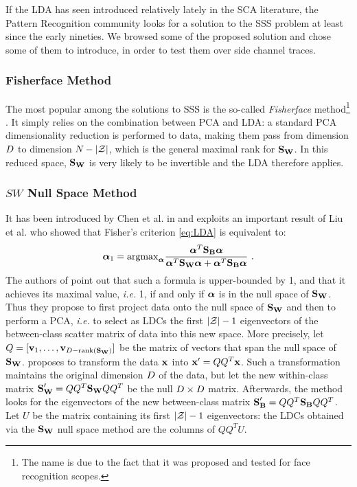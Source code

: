 If the LDA has seen introduced relatively lately in the SCA literature, the Pattern Recognition community looks for a solution to the SSS problem at least since the early nineties. We browsed some of the proposed solution and chose some of them to introduce, in order to test them over side channel traces.

\subsubsection{Fisherface Method}
The most popular among the solutions to SSS is the so-called {\em Fisherface} method\footnote{The name is due to the fact that it was proposed and tested for face recognition scopes.} \cite{eigenfaces}. It simply relies on the combination between PCA and LDA: a standard PCA dimensionality reduction is performed to data, making them pass from dimension $\traceLength$ to dimension $\numTraces[]-\lvert \sensVarSet \rvert$, which is the general maximal rank for $\SW$. In this reduced space, $\SW$ is very likely to be invertible and the LDA therefore applies.

\subsubsection{$SW$ Null Space Method}
It has been introduced by Chen et al. in \cite{Chen2000} and exploits an important result of Liu et al. \cite{liu1992generalized} who showed that Fisher's criterion \eqref{eq:LDA} is equivalent to:
 \begin{equation}
 \AAlpha_1=\mathrm{argmax}_{\AAlpha} \frac{\AAlpha^T \SB \AAlpha}{\AAlpha^T \SW \AAlpha + \AAlpha^T \SB \AAlpha} \mbox{ .}
 \end{equation}
The authors of \cite{Chen2000} point out that such a formula is upper-bounded by 1, and that it achieves its maximal value, \textit{i.e.} 1, if and only if  $\AAlpha$ is in the null space of $\SW$. Thus they propose to first project data onto the null space of $\SW$ and then to perform a PCA, \textit{i.e.} to select as LDCs the first $\lvert \sensVarSet \rvert - 1$ eigenvectors of the between-class scatter matrix of data into this new space. More precisely, let $Q = [\vvv_1, \dots, \vvv_{\traceLength - \mathrm{rank}(\SW)}]$ be the matrix of vectors that span the null space of $\SW$. \cite{Chen2000} proposes to transform the data $\sss[]{}$ into $\xxx' = QQ^T\xxx$. Such a transformation maintains the original dimension $\traceLength$ of the data, but let the new within-class matrix $\SW' = QQ^T\SW QQ^T$ be the null $\traceLength \times \traceLength$ matrix. Afterwards, the method looks for the eigenvectors of the new between-class matrix $\SB' = QQ^T\SB QQ^T$. Let $U$ be the matrix containing its first $\lvert \sensVarSet \rvert - 1$ eigenvectors: the LDCs obtained via the $\SW$ null space method are the columns of $QQ^TU$.

